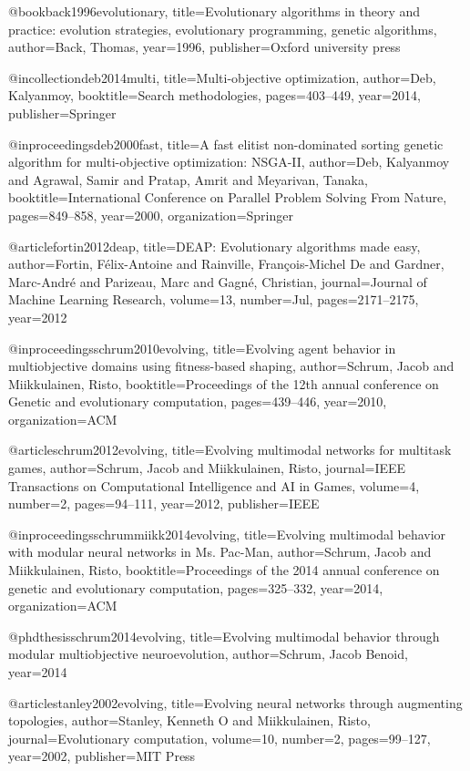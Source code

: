 @book{back1996evolutionary,
  title={Evolutionary algorithms in theory and practice: evolution strategies, evolutionary programming, genetic algorithms},
  author={Back, Thomas},
  year={1996},
  publisher={Oxford university press}
}

@incollection{deb2014multi,
  title={Multi-objective optimization},
  author={Deb, Kalyanmoy},
  booktitle={Search methodologies},
  pages={403--449},
  year={2014},
  publisher={Springer}
}

@inproceedings{deb2000fast,
  title={A fast elitist non-dominated sorting genetic algorithm for multi-objective optimization: NSGA-II},
  author={Deb, Kalyanmoy and Agrawal, Samir and Pratap, Amrit and Meyarivan, Tanaka},
  booktitle={International Conference on Parallel Problem Solving From Nature},
  pages={849--858},
  year={2000},
  organization={Springer}
}

@article{fortin2012deap,
  title={DEAP: Evolutionary algorithms made easy},
  author={Fortin, F{\'e}lix-Antoine and Rainville, Fran{\c{c}}ois-Michel De and Gardner, Marc-Andr{\'e} and Parizeau, Marc and Gagn{\'e}, Christian},
  journal={Journal of Machine Learning Research},
  volume={13},
  number={Jul},
  pages={2171--2175},
  year={2012}
}

@inproceedings{schrum2010evolving,
  title={Evolving agent behavior in multiobjective domains using fitness-based shaping},
  author={Schrum, Jacob and Miikkulainen, Risto},
  booktitle={Proceedings of the 12th annual conference on Genetic and evolutionary computation},
  pages={439--446},
  year={2010},
  organization={ACM}
}

@article{schrum2012evolving,
  title={Evolving multimodal networks for multitask games},
  author={Schrum, Jacob and Miikkulainen, Risto},
  journal={IEEE Transactions on Computational Intelligence and AI in Games},
  volume={4},
  number={2},
  pages={94--111},
  year={2012},
  publisher={IEEE}
}

@inproceedings{schrummiikk2014evolving,
  title={Evolving multimodal behavior with modular neural networks in Ms. Pac-Man},
  author={Schrum, Jacob and Miikkulainen, Risto},
  booktitle={Proceedings of the 2014 annual conference on genetic and evolutionary computation},
  pages={325--332},
  year={2014},
  organization={ACM}
}

@phdthesis{schrum2014evolving,
  title={Evolving multimodal behavior through modular multiobjective neuroevolution},
  author={Schrum, Jacob Benoid},
  year={2014}
}

@article{stanley2002evolving,
  title={Evolving neural networks through augmenting topologies},
  author={Stanley, Kenneth O and Miikkulainen, Risto},
  journal={Evolutionary computation},
  volume={10},
  number={2},
  pages={99--127},
  year={2002},
  publisher={MIT Press}
}

